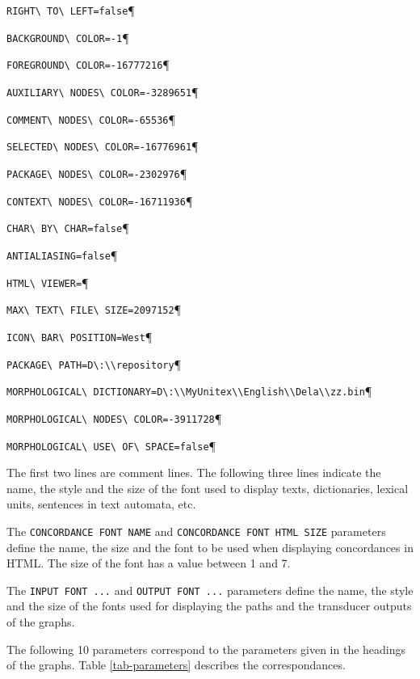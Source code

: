 \verb$RIGHT\ TO\ LEFT=false$\P

\verb$BACKGROUND\ COLOR=-1$\P

\verb$FOREGROUND\ COLOR=-16777216$\P

\verb$AUXILIARY\ NODES\ COLOR=-3289651$\P

\verb$COMMENT\ NODES\ COLOR=-65536$\P

\verb$SELECTED\ NODES\ COLOR=-16776961$\P

\verb$PACKAGE\ NODES\ COLOR=-2302976$\P

\verb$CONTEXT\ NODES\ COLOR=-16711936$\P

\verb$CHAR\ BY\ CHAR=false$\P

\verb$ANTIALIASING=false$\P

\verb$HTML\ VIEWER=$\P

\verb$MAX\ TEXT\ FILE\ SIZE=2097152$\P

\verb$ICON\ BAR\ POSITION=West$\P

\verb$PACKAGE\ PATH=D\:\\repository$\P

\verb$MORPHOLOGICAL\ DICTIONARY=D\:\\MyUnitex\\English\\Dela\\zz.bin$\P

\verb$MORPHOLOGICAL\ NODES\ COLOR=-3911728$\P

\verb$MORPHOLOGICAL\ USE\ OF\ SPACE=false$\P


\bigskip
\noindent The first two lines are comment lines. The following three lines indicate the
name, the style and the size of the font used to display texts, dictionaries,
lexical units, sentences in text automata, etc.


\bigskip
\noindent The \verb$CONCORDANCE FONT NAME$ and \verb$CONCORDANCE FONT HTML SIZE$ parameters
define the name, the size and the font to be used when displaying concordances in
HTML. The size of the font has a value between 1 and 7.


\bigskip
\noindent The \verb$INPUT FONT ...$ and \verb$OUTPUT FONT ...$ parameters define the name,
the style and the size of the fonts used for displaying the paths and the
transducer outputs of the graphs.


\bigskip
\noindent The following 10 parameters correspond to the parameters given in the headings of
the graphs. Table \ref{tab-parameters} describes the
correspondances.


